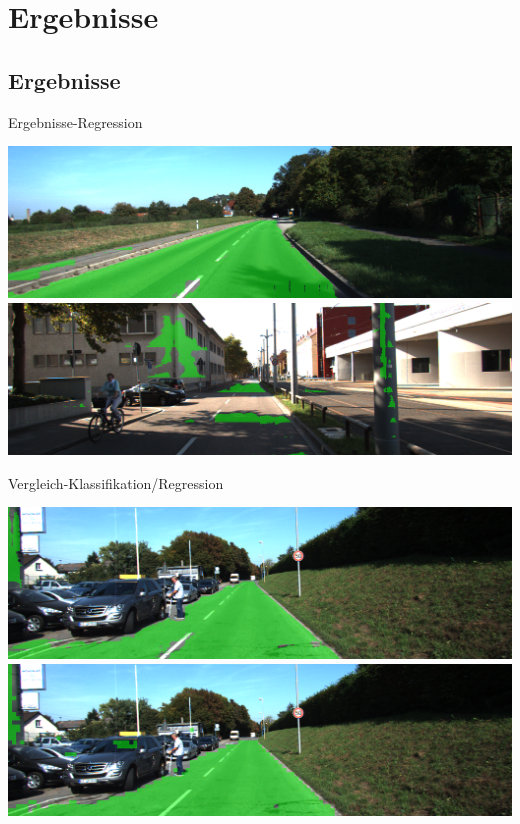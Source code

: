 \section{Ergebnisse}

\subsection{Ergebnisse}

\begin{frame}{Ergebnisse-Regression}
\begin{center}
    \includegraphics[scale=0.24]{../images/Convolutional/um_000014+-overlay-fully-49-patch.png}
    \vspace{0.1cm}
    \includegraphics[scale=0.24]{../images/Convolutional/um_000066-overlay-fully-49-patch.png}
        \end{center}
 \end{frame}

\begin{frame}{Vergleich-Klassifikation/Regression}
  \begin{center}
      \includegraphics[scale=0.24]{../images/Convolutional/um_000014-overlay-fully-49-patch.png}
         \vspace{0.1cm}
    \includegraphics[scale=0.24]{../images/Convolutional/um_000014-overlay.png}
    \end{center}
\end{frame}

